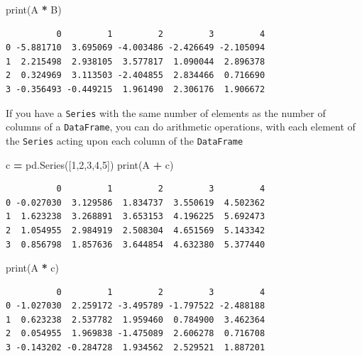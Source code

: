 \documentclass[
  letterpaper,
]{scrbook}
\newenvironment{Shaded}{\begin{snugshade}}{\end{snugshade}}
\newcommand{\BuiltInTok}[1]{#1}
\newcommand{\DecValTok}[1]{\textcolor[rgb]{0.00,0.00,0.81}{#1}}
\newcommand{\NormalTok}[1]{#1}
\newcommand{\OperatorTok}[1]{\textcolor[rgb]{0.81,0.36,0.00}{\textbf{#1}}}
\begin{document}
\begin{Shaded}
\begin{Highlighting}[]
\BuiltInTok{print}\NormalTok{(A }\OperatorTok{*}\NormalTok{ B)}
\end{Highlighting}
\end{Shaded}

\begin{verbatim}
          0         1         2         3         4
0 -5.881710  3.695069 -4.003486 -2.426649 -2.105094
1  2.215498  2.938105  3.577817  1.090044  2.896378
2  0.324969  3.113503 -2.404855  2.834466  0.716690
3 -0.356493 -0.449215  1.961490  2.306176  1.906672
\end{verbatim}

If you have a \texttt{Series} with the same number of elements as the number of columns of a \texttt{DataFrame}, you can do arithmetic operations, with each element of the \texttt{Series} acting upon each column of the \texttt{DataFrame}

\begin{Shaded}
\begin{Highlighting}[]
\NormalTok{c }\OperatorTok{=}\NormalTok{ pd.Series([}\DecValTok{1}\NormalTok{,}\DecValTok{2}\NormalTok{,}\DecValTok{3}\NormalTok{,}\DecValTok{4}\NormalTok{,}\DecValTok{5}\NormalTok{])}
\BuiltInTok{print}\NormalTok{(A }\OperatorTok{+}\NormalTok{ c)}
\end{Highlighting}
\end{Shaded}

\begin{verbatim}
          0         1         2         3         4
0 -0.027030  3.129586  1.834737  3.550619  4.502362
1  1.623238  3.268891  3.653153  4.196225  5.692473
2  1.054955  2.984919  2.508304  4.651569  5.143342
3  0.856798  1.857636  3.644854  4.632380  5.377440
\end{verbatim}

\begin{Shaded}
\begin{Highlighting}[]
\BuiltInTok{print}\NormalTok{(A }\OperatorTok{*}\NormalTok{ c)}
\end{Highlighting}
\end{Shaded}

\begin{verbatim}
          0         1         2         3         4
0 -1.027030  2.259172 -3.495789 -1.797522 -2.488188
1  0.623238  2.537782  1.959460  0.784900  3.462364
2  0.054955  1.969838 -1.475089  2.606278  0.716708
3 -0.143202 -0.284728  1.934562  2.529521  1.887201
\end{verbatim}
\end{document}
